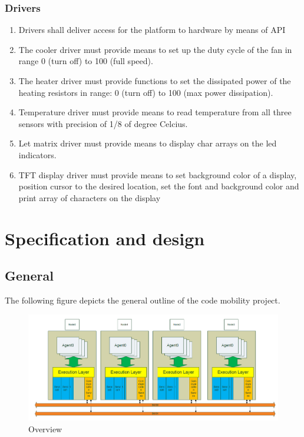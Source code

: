\documentclass{scrreprt}
\begin{document}
\subsection{Drivers}
\renewcommand{\labelenumi}{R_LL_DRV_\arabic{enumi}}
\begin{enumerate}
\item Drivers shall deliver access for the platform to hardware by means of API
\item The cooler driver must provide means to set up the duty cycle of the fan in range 0 (turn off) to 100 (full speed).
\item The heater driver must provide functions to set the dissipated power of the heating resistors in range:
	0 (turn off) to 100 (max power dissipation).
\item Temperature driver must provide means to read temperature from all three sensors with precision of 1/8 of degree Celcius.
\item Let matrix driver must provide means to display char arrays on the led indicators.
\item TFT display driver must provide means to set background color of a display, position cursor to the desired location,
	set the font and background color and print array of characters on the display
\end{enumerate}



\chapter{Specification and design}

\section{General}

The following figure depicts the general outline of the code mobility project.

\begin{figure}[!htb]
\includegraphics[scale=0.4]{figures/global.png}
\caption{Overview}
\end{figure}
\end{document}
